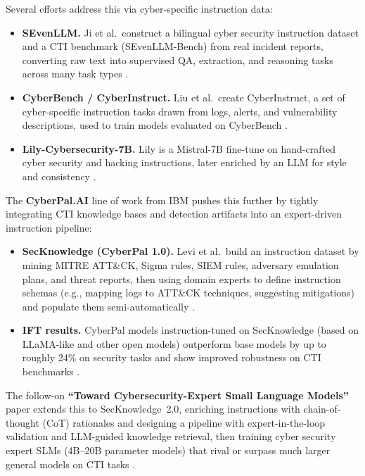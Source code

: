 \documentclass[unnumsec,webpdf,contemporary,large]{oup-authoring-template}
\theoremstyle{thmstyleone}
\theoremstyle{thmstyletwo}
\theoremstyle{thmstylethree}
\begin{document}
Several efforts address this via cyber-specific instruction data:

\begin{itemize}
  \item \textbf{SEvenLLM.} Ji et al.\ construct a bilingual cyber security instruction dataset and a CTI benchmark (SEvenLLM-Bench) from real incident reports, converting raw text into supervised QA, extraction, and reasoning tasks across many task types \cite{ji2024sevenllm}.
  \item \textbf{CyberBench / CyberInstruct.} Liu et al.\ create CyberInstruct, a set of cyber-specific instruction tasks drawn from logs, alerts, and vulnerability descriptions, used to train models evaluated on CyberBench \cite{liu2024cyberbench}.
  \item \textbf{Lily-Cybersecurity-7B.} Lily is a Mistral-7B fine-tune on hand-crafted cyber security and hacking instructions, later enriched by an LLM for style and consistency \cite{liu2024cyberbench}.
\end{itemize}

The \textbf{CyberPal.AI} line of work from IBM pushes this further by tightly integrating CTI knowledge bases and detection artifacts into an expert-driven instruction pipeline:

\begin{itemize}
  \item \textbf{SecKnowledge (CyberPal 1.0).} Levi et al.\ build an instruction dataset by mining MITRE ATT\&CK, Sigma rules, SIEM rules, adversary emulation plans, and threat reports, then using domain experts to define instruction schemas (e.g., mapping logs to ATT\&CK techniques, suggesting mitigations) and populate them semi-automatically \cite{levi2024cyberpal}.
  \item \textbf{IFT results.} CyberPal models instruction-tuned on SecKnowledge (based on LLaMA-like and other open models) outperform base models by up to roughly 24\% on security tasks and show improved robustness on CTI benchmarks \cite{levi2024cyberpal}.
\end{itemize}

The follow-on \textbf{``Toward Cybersecurity-Expert Small Language Models''} paper extends this to SecKnowledge~2.0, enriching instructions with chain-of-thought (CoT) rationales and designing a pipeline with expert-in-the-loop validation and LLM-guided knowledge retrieval, then training cyber security expert SLMs (4B--20B parameter models) that rival or surpass much larger general models on CTI tasks \cite{levi2025toward}.
\end{document}
